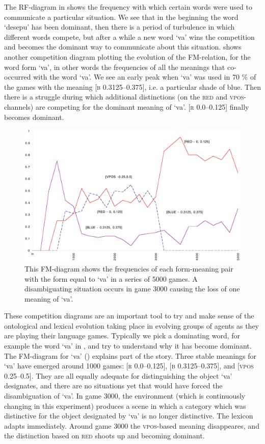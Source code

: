 The RF-diagram in  shows the 
frequency with which certain words were used to communicate 
a particular situation. We see that in
the beginning the word `desepu' has been dominant, then 
there is a period of turbulence in which different 
words compete, but after a while a new word `va' wins 
the competition and becomes the dominant way to communicate 
about this situation.  shows another
competition diagram plotting the evolution of the FM-relation, for 
the word form `va', in other words the frequencies of 
all the meanings that co-occurred with the word `va'. 
We see an early peak when `va' was used in 70 \% of the 
games with the meaning [\textsc{b} 0.3125–0.375], i.e. a particular
shade of blue. Then there is a struggle during which additional
distinctions (on the \textsc{red} and \textsc{vpos}-channels) are competing
for the dominant meaning of `va'. 
[\textsc{r} 0.0–0.125] finally becomes dominant. 

\begin{figure}[htbp]
  \centerline{\includegraphics[width=.80\textwidth]{chap7/figs/fm.pdf}}
\caption{\label{FM-diagram}This FM-diagram shows
the frequencies of each form-meaning pair with 
the form equal to `va' in a series of 5000 games.
A disambiguating situation occurs in game 3000
causing the loss of one meaning of `va'.}
\end{figure}

These competition diagrams are an important tool to try 
and make sense of the ontological and lexical evolution
taking place in evolving groups of agents as they are
playing their language games. Typically we pick
a dominating word, for example the word `va' in 
, and try to understand
why it has become dominant. 
The FM-diagram for `va' () explains
part of the story. Three stable meanings for `va' have emerged
around 1000 games: 
[\textsc{r} 0.0–0.125], [\textsc{b} 0.3125–0.375], and [\textsc{vpos} 0.25–0.5]. 
They are all equally adequate for distinguishing the object
`va' designates, and there are no situations yet
that would have forced the disambiguation of `va'. 
In game 3000, the environment (which is continuously 
changing in this experiment) produces a scene in which
a category which was distinctive for the object designated by 
`va' is no longer distinctive. The lexicon adapts 
immediately. Around game 3000 the \textsc{vpos}-based meaning disappeares, 
and the distinction based on \textsc{red} shoots up and becoming dominant. 

